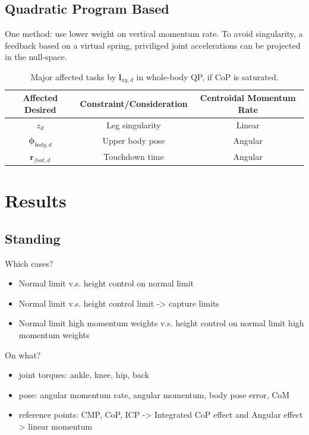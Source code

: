 \subsection{Quadratic Program Based}
One method: use lower weight on vertical momentum rate. To avoid singularity, a feedback based on a virtual spring, priviliged joint accelerations can be projected in the null-space. 

\begin{table}[ht]
\caption{Major affected tasks by $\mathbf{\dot{l}}_{xy,d}$ in whole-body QP, if \ac{CoP} is saturated.} %
\centering %
\begin{tabular}{c c c } %
\hline\hline %
Affected Desired & Constraint/Consideration & Centroidal Momentum Rate \\
\hline %
 $z_d$ & Leg singularity & Linear\\
 $\boldsymbol{\phi}_{body,d}$ & Upper body pose & Angular\\
 $\mathbf{r}_{foot,d}$ &  Touchdown time & Angular\\
\hline %
\end{tabular}
\label{tab:eatqp} %
\end{table}


\section{Results}
\subsection{Standing}
Which cases?
\begin{itemize}
	\item Normal limit v.s. height control on normal limit
	\item Normal limit v.s. height control limit -> capture limits
	\item Normal limit high momentum weights v.s. height control on normal limit high momentum weights
\end{itemize}

On what?
\begin{itemize}
	\item joint torques: ankle, knee, hip, back
	\item pose: angular momentum rate, angular momentum, body pose error, CoM
	\item reference points: CMP, CoP, ICP -> Integrated CoP effect and Angular effect > linear momentum
\end{itemize}
